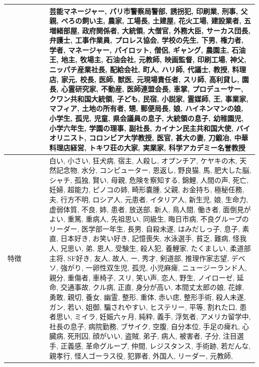 \documentclass[a4j,12pt]{jsreport}
\begin{document}
\setlongtables
\begin{tabularx}{\textwidth}{l|X}
   　　　　　&芸能マネージャー, パリ市警察局警部, 誘拐犯, 印刷業, 刑事, 父親, ぺろの飼い主, 農家, 工場長, 土建屋,  花火工場, 建設業者, 五増緒部屋, 政府関係者, 大統領, 大僧官, 外務大臣, サーカス団長, 弁護士, 工事作業員, プロレス協会, 学校の先生, 下男, 権力者, 学者, マネージャー, パイロット, 僧侶, ギャング, 農園主, 石油王, 地主, 牧場主, 石油会社, 元教師, 映画監督, 印刷工場, 神父, ニッパチ産業社長, 配給会社, 町人, ハリ師, 代議士, 教授, 料理店, 家元, 校長, 医師, 獣医, 元現場責任者, スリ師, 高利貸し, 園長, 心霊研究家, 不動産, 医師連盟会長, 車掌, プロデューサー, クワン共和国大統領, 子ども, 民宿, 小説家, 霊媒師, 王, 事業家, マフィア, 土地の所有者, 甥, 郵便局長, 娘, ハイネンマンの娘, 小学生, 孤児, 児童, 県会議員の息子, 大統領の息子, 幼稚園児, 小学六年生, 学園の理事, 副社長, カイナン民主共和国大使, バイオリニスト, コロンビア大学教授, 医官, 甚大の妻, 刀鍛冶, 中華料理店経営, トキワ荘の大家, 実業家, 科学アカデミー名誉教授\\
   \hline
   特徴 & 白い, 小さい, 狂犬病, 宿主, 人殺し, オプンチア, ケヤキの木, 天然記念物, 水分, コンピューター, 恩返し, 野良猫, 馬, 肥大した脳, シャチ, 孤独, 賢い, 母親, 危険を察知する, 錦鯉, 人間の声, 死亡, 妊婦, 超能力, ピノコの姉, 畸形嚢腫, 父親, お金持ち, 極秘任務, 夫, 行方不明, ロシア人, 元患者, イタリア人, 新生児, 娘, 生命力, 虚弱体質, 不良, 姉, 患者, 放送部, 新人, 鳥人間, 働き者, 面倒見がよい, 重篤, 重病人, 先祖思い, 同級生, 晦日市病, 不良グループのリーダー, 医学部一年生, 長男, 自殺未遂, はみだしっ子, 息子, 素直, 日本好き, お笑い好き, 記憶喪失, 水泳選手, 貧乏, 難病, 怪我人, 兄思い, 弟, 恩人, 受験生, 殺人犯, 養鯉家, たくましい, 柔道部主将, SF好き, 友人, 故人, ー, 秀才, 剣道部, 推理作家志望, デベソ, 強がり, 一卵性双生児, 孤児, 小児麻痺, ニュージーランド人, 親分, 重傷者, 車椅子, スリ, 笑い声, 恋人, 野生, ノイローゼ, 延命, 交通事故, クル病, 正直, 身分が高い, 本間丈太郎の娘, 花嫁, 勇敢, 親切, 養女, 幽霊, 整形, 重体, 赤い痣, 整形手術, 殺人未遂, ガン, 若い, 姐御, 騙されやすい, ヒステリー, 平等, 割れた口, 患者思い, ミイラ, 妊娠六ヶ月, 純粋, 義手, 浮気者, アメリカ留学中, 社長の息子, 病院勤務, ブサイク, 空腹, 自分本位, 手足の痺れ, 心臓病, 死刑囚, 顔がいい, 盗賊, 弟子, 病人, 被害者, 子分, 注目選手, 正義感, 革命グループ, 仲間, レジスタンス, 手術跡, 若だんな, 親孝行, 怪人ゴーラス役, 犯罪者, 外国人, リーダー, 元教師,\\
\end{tabularx} 
   
\end{document}
